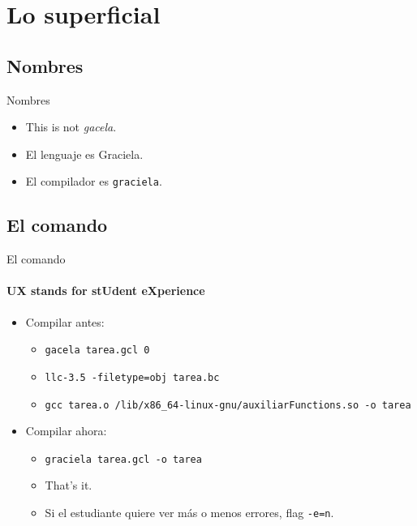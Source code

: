 \section{Lo superficial}

\subsection{Nombres}
\begin{frame}{Nombres}
\begin{itemize}
  \item This is not \textit{gacela}.
  \item El lenguaje es Graciela.
  \item El compilador es \texttt{graciela}.
\end{itemize}
\end{frame}


\subsection{El comando}
\begin{frame}{El comando}
\framesubtitle{UX stands for stUdent eXperience}
\begin{itemize}
  \item Compilar antes: \begin{itemize}
    \item\texttt{gacela tarea.gcl 0}
    \item\texttt{llc-3.5 -filetype=obj tarea.bc}
    \item\texttt{gcc tarea.o /lib/x86\_64-linux-gnu/auxiliarFunctions.so -o tarea}
  \end{itemize}
   \item Compilar ahora: \begin{itemize}
    \item\texttt{graciela tarea.gcl -o tarea}
    \item That's it.
    \item Si el estudiante quiere ver más o menos errores, flag \texttt{-e=n}.
  \end{itemize}
\end{itemize}
\end{frame}


